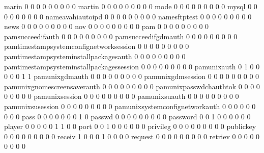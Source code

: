 \documentclass[compress,8pt]{beamer}
\begin{document}
\begin{frame}
\begin{Schunk}
  marin                                      0   0   0   0   0   0   0   0   0
  martin                                     0   0   0   0   0   0   0   0   0
  mode                                       0   0   0   0   0   0   0   0   0
  mysql                                      0   0   0   0   0   0   0   0   0
  nameavahiautoipd                           0   0   0   0   0   0   0   0   0
  namesftptest                               0   0   0   0   0   0   0   0   0
  news                                       0   0   0   0   0   0   0   0   0
  nov                                        0   0   0   0   0   0   0   0   0
  pam                                        0   0   0   0   0   0   0   0   0
  pamsucceedifauth                           0   0   0   0   0   0   0   0   0
  pamsucceedifgdmauth                        0   0   0   0   0   0   0   0   0
  pamtimestampsystemconfignetworksession     0   0   0   0   0   0   0   0   0
  pamtimestampsysteminstallpackagesauth      0   0   0   0   0   0   0   0   0
  pamtimestampsysteminstallpackagessession   0   0   0   0   0   0   0   0   0
  pamunixauth                                0   1   0   0   0   0   0   1   1
  pamunixgdmauth                             0   0   0   0   0   0   0   0   0
  pamunixgdmsession                          0   0   0   0   0   0   0   0   0
  pamunixgnomescreensaverauth                0   0   0   0   0   0   0   0   0
  pamunixpasswdchauthtok                     0   0   0   0   0   0   0   0   0
  pamunixsession                             0   0   0   0   0   0   0   0   0
  pamunixsuauth                              0   0   0   0   0   0   0   0   0
  pamunixsusession                           0   0   0   0   0   0   0   0   0
  pamunixsystemconfignetworkauth             0   0   0   0   0   0   0   0   0
  pass                                       0   0   0   0   0   0   0   1   0
  passwd                                     0   0   0   0   0   0   0   0   0
  password                                   0   0   1   0   0   0   0   0   0
  player                                     0   0   0   0   0   1   1   0   0
  port                                       0   0   1   0   0   0   0   0   0
  privileg                                   0   0   0   0   0   0   0   0   0
  publickey                                  0   0   0   0   0   0   0   0   0
  receiv                                     1   0   0   0   1   0   0   0   0
  request                                    0   0   0   0   0   0   0   0   0
  retriev                                    0   0   0   0   0   0   0   0   0

\end{Schunk}
\end{frame}
\end{document}
